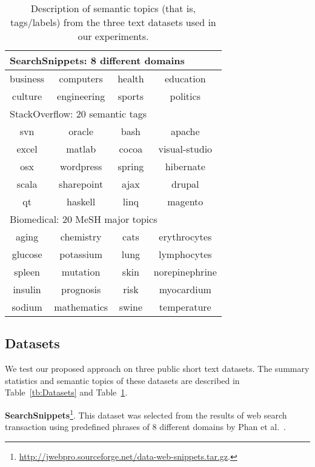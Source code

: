 \documentclass[review]{elsarticle}
\begin{document}
\begin{table}[t] %
\begin{center}
\begin{tabular}{|c|c|c|c|}\hline
\multicolumn{4}{|l|}{SearchSnippets: 8 different domains}\\\hline
 business & computers & health & education  \\\hline
culture  & engineering& sports& politics  \\\hline\hline

\multicolumn{4}{|l|}{StackOverflow: 20 semantic tags}\\\hline
 svn & oracle & bash & apache  \\\hline
excel & matlab& cocoa& visual-studio  \\\hline
 osx & wordpress& spring &hibernate \\\hline
 scala & sharepoint & ajax & drupal \\\hline
qt  & haskell  & linq & magento \\\hline\hline

\multicolumn{4}{|l|}{Biomedical: 20 MeSH major topics}\\\hline
 aging & chemistry& cats  & erythrocytes  \\\hline
glucose & potassium& lung & lymphocytes  \\\hline
spleen & mutation&skin  &norepinephrine \\\hline
insulin & prognosis & risk & myocardium \\\hline
sodium  &  mathematics & swine & temperature \\\hline
\end{tabular}
\end{center}
\caption{\label{tb:SemanticTopics} Description of semantic topics (that is, tags/labels) from the three text datasets used in our experiments.}
\end{table}

\subsection{Datasets}
We test our proposed approach on three public short text datasets. The summary statistics and semantic topics of these datasets are described in Table~\ref{tb:Datasets} and Table~\ref{tb:SemanticTopics}.

{\bf{SearchSnippets}}\footnote{\url{http://jwebpro.sourceforge.net/data-web-snippets.tar.gz}.}. This dataset was selected from the results of web search transaction using predefined phrases of 8 different domains by Phan et al.~\cite{20_phan2008learning}.
\end{document}
